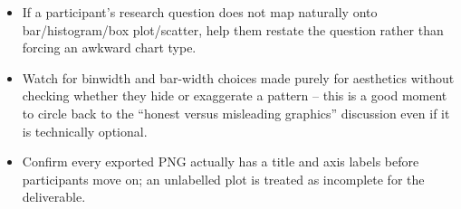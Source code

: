 \documentclass[11pt]{article}
\providecommand{\tightlist}{%
  \setlength{\itemsep}{0pt}\setlength{\parskip}{0pt}}
\begin{document}
\begin{itemize}
\tightlist
\item
  If a participant's research question does not map naturally onto
  bar/histogram/box plot/scatter, help them restate the question rather
  than forcing an awkward chart type.
\item
  Watch for binwidth and bar-width choices made purely for aesthetics
  without checking whether they hide or exaggerate a pattern -- this is
  a good moment to circle back to the ``honest versus misleading
  graphics'' discussion even if it is technically optional.
\item
  Confirm every exported PNG actually has a title and axis labels before
  participants move on; an unlabelled plot is treated as incomplete for
  the deliverable.
\end{itemize}
\end{document}
